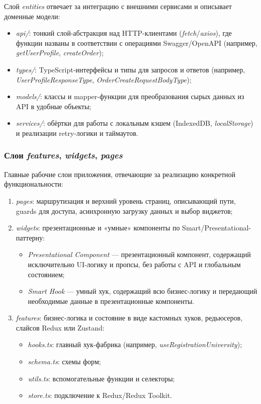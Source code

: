 Слой \textit{entities} отвечает за интеграцию с внешними сервисами и описывает доменные модели:
\begin{itemize}
  \item \textit{api/}: тонкий слой-абстракция над HTTP-клиентами (\textit{fetch}/\textit{axios}), где функции названы в соответствии с операциями Swagger/OpenAPI (например, \textit{getUserProfile}, \textit{createOrder});
  \item \textit{types/}: TypeScript-интерфейсы и типы для запросов и ответов (например, \textit{UserProfileResponseType}, \textit{OrderCreateRequestBodyType});
  \item \textit{models/}: классы и mapper-функции для преобразования сырых данных из API в удобные объекты;
  \item \textit{services/}: обёртки для работы с локальным кэшем (IndexedDB, \textit{localStorage}) и реализации retry-логики и таймаутов.
\end{itemize}

\subsubsection{Слои \textit{features}, \textit{widgets}, \textit{pages}}

Главные рабочие слои приложения, отвечающие за реализацию конкретной функциональности:
\begin{enumerate}
  \item \textit{pages}: маршрутизация и верхний уровень страниц, описывающий пути, guards для доступа, асинхронную загрузку данных и выбор виджетов;
  \item \textit{widgets}: презентационные и «умные» компоненты по Smart/Presentational-паттерну:
    \begin{itemize}
        \item \emph{Presentational Component} — презентационный компонент, содержащий исключительно UI-логику и пропсы, без работы с API и глобальным состоянием;
        \item \emph{Smart Hook} — умный хук, содержащий всю бизнес-логику и передающий необходимые данные в презентационные компоненты.
    \end{itemize}
  \item \textit{features}: бизнес-логика и состояние в виде кастомных хуков, редьюсеров, слайсов Redux или Zustand:
    \begin{itemize}
      \item \textit{hooks.ts}: главный хук-фабрика (например, \textit{useRegistrationUniversity});
      \item \textit{schema.ts}: схемы форм;
      \item \textit{utils.ts}: вспомогательные функции и селекторы;
      \item \textit{store.ts}: подключение к Redux/Redux Toolkit.
    \end{itemize}
\end{enumerate}

